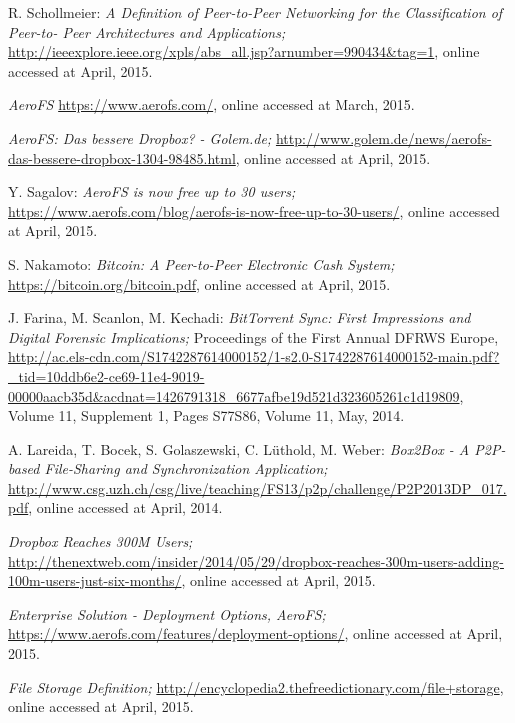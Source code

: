 \begin{thebibliography}{99}

		R. Schollmeier:
		\emph{A Definition of Peer-to-Peer Networking for the Classification of Peer-to- Peer Architectures and Applications;}
		\url{http://ieeexplore.ieee.org/xpls/abs_all.jsp?arnumber=990434&tag=1},
		online accessed at April, 2015.

		\emph{AeroFS}
		\url{https://www.aerofs.com/},
		online accessed at March, 2015.

		\emph{AeroFS: Das bessere Dropbox? - Golem.de;}
		\url{http://www.golem.de/news/aerofs-das-bessere-dropbox-1304-98485.html},
		online accessed at April, 2015.

		Y. Sagalov:
		\emph{AeroFS is now free up to 30 users;}
		\url{https://www.aerofs.com/blog/aerofs-is-now-free-up-to-30-users/},
		online accessed at April, 2015.
		
		S. Nakamoto:
		\emph{Bitcoin: A Peer-to-Peer Electronic Cash System;}
		\url{https://bitcoin.org/bitcoin.pdf},
		online accessed at April, 2015.

		J. Farina, M. Scanlon, M. Kechadi:
		\emph{BitTorrent Sync: First Impressions and Digital Forensic Implications;}
		Proceedings of the First Annual DFRWS Europe,
		\url{http://ac.els-cdn.com/S1742287614000152/1-s2.0-S1742287614000152-main.pdf?_tid=10ddb6e2-ce69-11e4-9019-00000aacb35d&acdnat=1426791318_6677afbe19d521d323605261c1d19809},
		Volume 11, Supplement 1, Pages S77\textendash S86, Volume 11, May, 2014.

		A. Lareida, T. Bocek, S. Golaszewski, C. L\"uthold, M. Weber:
		\emph{Box2Box - A P2P-based File-Sharing and Synchronization Application;}
		\url{http://www.csg.uzh.ch/csg/live/teaching/FS13/p2p/challenge/P2P2013DP_017.pdf},
		online accessed at April, 2014.

		\emph{Dropbox Reaches 300M Users;}
		\url{http://thenextweb.com/insider/2014/05/29/dropbox-reaches-300m-users-adding-100m-users-just-six-months/},
		online accessed at April, 2015.

		\emph{Enterprise Solution - Deployment Options, AeroFS;}
		\url{https://www.aerofs.com/features/deployment-options/},
		online accessed at April, 2015.

		\emph{File Storage Definition;}
		\url{http://encyclopedia2.thefreedictionary.com/file+storage},
		online accessed at April, 2015.


\end{thebibliography}
